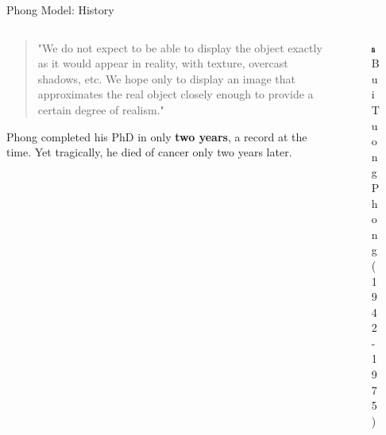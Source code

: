 \begin{frame}{Phong Model: History}
\begin{columns}
\begin{column}{0.7\textwidth}
      \begin{quote}
        \footnotesize
        "We do not expect to be able to display the object exactly as it would appear in reality, with texture, overcast shadows, etc. We hope only to display an image that approximates the real object closely enough to provide a certain degree of realism."
      \end{quote}
      {\small
        Phong completed his PhD in only \textbf{two years}, a record at the time. Yet tragically, he died of cancer only two years later.
      }
    \end{column}
    \begin{column}{0.3\textwidth}
      \begin{figure}
        \centering
        \includegraphics[width=\linewidth]{images/phong.jpg}
        \caption*{Bui Tuong Phong (1942-1975)}
      \end{figure}
    \end{column}
  \end{columns}
\end{frame}

